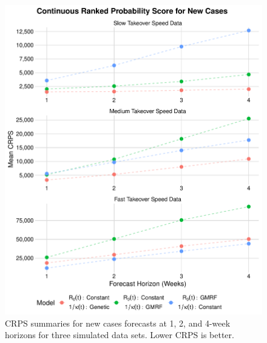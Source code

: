 \begin{figure}
    \centering
    \includegraphics[width=1.0\columnwidth]{simulated_crps_comparison_dotplot_data_new_cases_plot}
    \caption{CRPS summaries for new cases forecasts at 1, 2, and 4-week horizons for three simulated data sets. Lower CRPS is better.}
    \label{ch_5:fig:simulated_crps_comparison_dotplot_data_new_cases_plot}
\end{figure}

